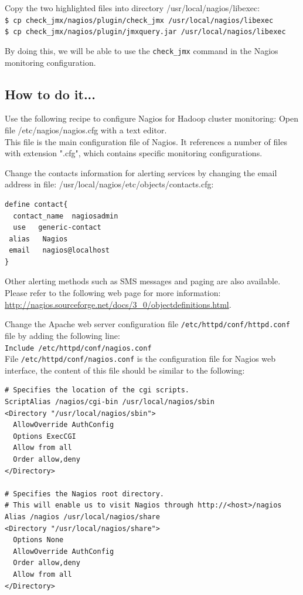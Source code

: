
Copy the two highlighted files into directory /usr/local/nagios/libexec: \\
\verb|$ cp check_jmx/nagios/plugin/check_jmx /usr/local/nagios/libexec| \\
\verb|$ cp check_jmx/nagios/plugin/jmxquery.jar /usr/local/nagios/libexec|

By doing this, we will be able to use the \verb|check_jmx| command in the Nagios monitoring configuration.

\subsection*{How to do it...}
Use the following recipe to configure Nagios for Hadoop cluster monitoring:
Open file /etc/nagios/nagios.cfg with a text editor. \\

This file is the main configuration file of Nagios. It references a number of files with extension ".cfg", which contains specific monitoring configurations.

Change the contacts information for alerting services by changing the email address in file: /usr/local/nagios/etc/objects/contacts.cfg: 
\begin{verbatim}
define contact{
  contact_name  nagiosadmin
  use   generic-contact
 alias   Nagios
 email   nagios@localhost
}
\end{verbatim}

Other alerting methods such as SMS messages and paging are also available. Please refer to the following web page for more information: \url{http://nagios.sourceforge.net/docs/3_0/objectdefinitions.html}.

Change the Apache web server configuration file \verb|/etc/httpd/conf/httpd.conf| file by adding the following line: \\
\verb|Include /etc/httpd/conf/nagios.conf| \\
File \verb|/etc/httpd/conf/nagios.conf| is the configuration file for Nagios web interface, the content of this file should be similar to the following:
\begin{verbatim}
# Specifies the location of the cgi scripts.
ScriptAlias /nagios/cgi-bin /usr/local/nagios/sbin
<Directory "/usr/local/nagios/sbin">
  AllowOverride AuthConfig
  Options ExecCGI
  Allow from all
  Order allow,deny
</Directory>

# Specifies the Nagios root directory.
# This will enable us to visit Nagios through http://<host>/nagios
Alias /nagios /usr/local/nagios/share
<Directory "/usr/local/nagios/share">
  Options None
  AllowOverride AuthConfig
  Order allow,deny
  Allow from all
</Directory>
\end{verbatim}

